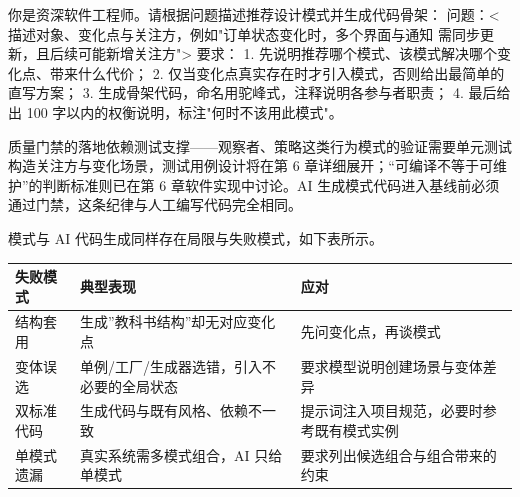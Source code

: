\documentclass[
]{ctexbook}
\newenvironment{Shaded}{
  \ttfamily\small
}{}
\newcommand{\NormalTok}[1]{#1}
\newcounter{none}
\begin{document}
\begin{Shaded}
\begin{Highlighting}[]
\NormalTok{你是资深软件工程师。请根据问题描述推荐设计模式并生成代码骨架：}
\NormalTok{问题：\textless{}描述对象、变化点与关注方，例如"订单状态变化时，多个界面与通知}
\NormalTok{需同步更新，且后续可能新增关注方"\textgreater{}}
\NormalTok{要求：}
\NormalTok{1. 先说明推荐哪个模式、该模式解决哪个变化点、带来什么代价；}
\NormalTok{2. 仅当变化点真实存在时才引入模式，否则给出最简单的直写方案；}
\NormalTok{3. 生成骨架代码，命名用驼峰式，注释说明各参与者职责；}
\NormalTok{4. 最后给出 100 字以内的权衡说明，标注"何时不该用此模式"。}
\end{Highlighting}
\end{Shaded}

质量门禁的落地依赖测试支撑------观察者、策略这类行为模式的验证需要单元测试构造关注方与变化场景，测试用例设计将在第
6 章详细展开；``可编译不等于可维护''的判断标准则已在第 6
章软件实现中讨论。AI
生成模式代码进入基线前必须通过门禁，这条纪律与人工编写代码完全相同。

模式与 AI 代码生成同样存在局限与失败模式，如下表所示。

{\def\LTcaptype{none} %
\begin{longtable}[]{@{}
  >{\raggedright\arraybackslash}p{}
  >{\raggedright\arraybackslash}p{}
  >{\raggedright\arraybackslash}p{}@{}}
\toprule\noalign{}
\begin{minipage}[b]{\linewidth}\raggedright
失败模式
\end{minipage} & \begin{minipage}[b]{\linewidth}\raggedright
典型表现
\end{minipage} & \begin{minipage}[b]{\linewidth}\raggedright
应对
\end{minipage} \\
\midrule\noalign{}
\endhead
\bottomrule\noalign{}
\endlastfoot
结构套用 & 生成''教科书结构''却无对应变化点 & 先问变化点，再谈模式 \\
变体误选 & 单例/工厂/生成器选错，引入不必要的全局状态 &
要求模型说明创建场景与变体差异 \\
双标准代码 & 生成代码与既有风格、依赖不一致 &
提示词注入项目规范，必要时参考既有模式实例 \\
单模式遗漏 & 真实系统需多模式组合，AI 只给单模式 &
要求列出候选组合与组合带来的约束 \\
\end{longtable}
}
\end{document}
